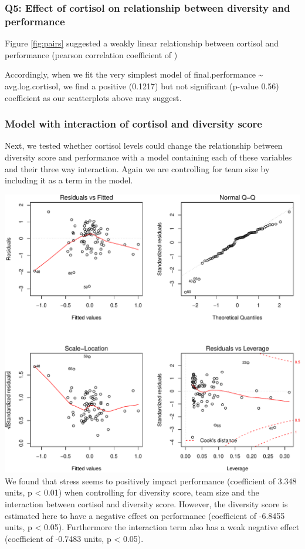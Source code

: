 \documentclass[]{article}
\begin{document}
\hypertarget{q5-effect-of-cortisol-on-relationship-between-diversity-and-performance}{%
\subsubsection{Q5: Effect of cortisol on relationship between diversity
and
performance}\label{q5-effect-of-cortisol-on-relationship-between-diversity-and-performance}}

Figure \ref{fig:pairs} suggested a weakly linear relationship between
cortisol and performance (pearson correlation coefficient of )

Accordingly, when we fit the very simplest model of final.performance
\textasciitilde{} avg.log.cortisol, we find a positive (0.1217) but not
significant (p-value 0.56) coefficient as our scatterplots above may
suggest.

\hypertarget{model-with-interaction-of-cortisol-and-diversity-score}{%
\subsubsection{Model with interaction of cortisol and diversity
score}\label{model-with-interaction-of-cortisol-and-diversity-score}}

Next, we tested whether cortisol levels could change the relationship
between diversity score and performance with a model containing each of
these variables and their three way interaction. Again we are
controlling for team size by including it as a term in the model.

\includegraphics{19_10_02_hw5_q1_files/figure-latex/stress-1.pdf} We
found that stress seems to positively impact performance (coefficient of
3.348 units, p \textless{} 0.01) when controlling for diversity score,
team size and the interaction between cortisol and diversity score.
However, the diversity score is estimated here to have a negative effect
on performance (coefficient of -6.8455 units, p \textless{} 0.05).
Furthermore the interaction term also has a weak negative effect
(coefficient of -0.7483 units, p \textless{} 0.05).
\end{document}
